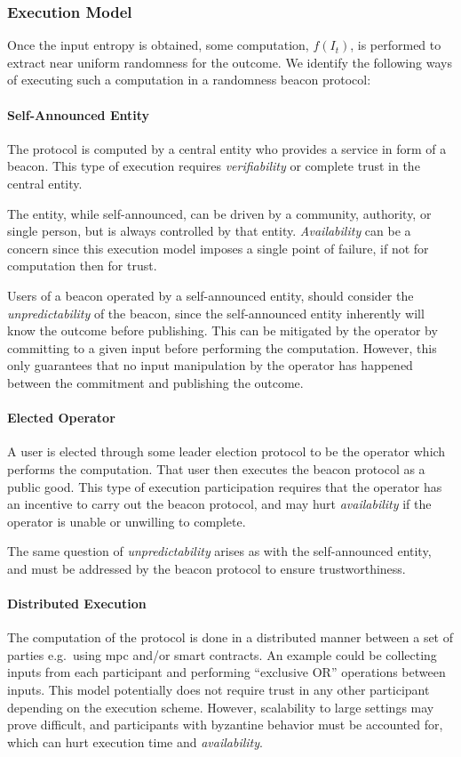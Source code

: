 \subsubsection{Execution Model}
Once the input entropy is obtained, some computation, $f(I_t)$, is performed to extract near uniform randomness for the outcome.
We identify the following ways of executing such a computation in a randomness beacon protocol:

\paragraph{Self-Announced Entity}
The protocol is computed by a central entity who provides a service in form of a beacon.
This type of execution requires \emph{verifiability} or complete trust in the central entity.

The entity, while self-announced, can be driven by a community, authority, or single person, but is always controlled by that entity.
\emph{Availability} can be a concern since this execution model imposes a single point of failure, if not for computation then for trust.

Users of a beacon operated by a self-announced entity, should consider the \emph{unpredictability} of the beacon, since the self-announced entity inherently will know the outcome before publishing.
This can be mitigated by the operator by committing to a given input before performing the computation.
However, this only guarantees that no input manipulation by the operator has happened between the commitment and publishing the outcome.

\paragraph{Elected Operator}
A user is elected through some leader election protocol to be the operator which performs the computation.
That user then executes the beacon protocol as a public good.
This type of execution participation requires that the operator has an incentive to carry out the beacon protocol, and may hurt \emph{availability} if the operator is unable or unwilling to complete.

The same question of \emph{unpredictability} arises as with the self-announced entity, and must be addressed by the beacon protocol to ensure trustworthiness.

\paragraph{Distributed Execution}
The computation of the protocol is done in a distributed manner between a set of parties e.g.\ using \gls{mpc} and/or smart contracts.
An example could be collecting inputs from each participant and performing \enquote{exclusive OR} operations between inputs.
This model potentially does not require trust in any other participant depending on the execution scheme.
However, scalability to large settings may prove difficult, and participants with byzantine behavior must be accounted for, which can hurt execution time and \emph{availability}.

